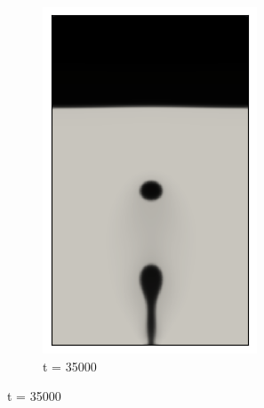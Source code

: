 \begin{figure}[H]
\begin{subfigure}{0.25\textwidth}
		\includegraphics[width=\linewidth]{figs/cap4/cuda_bb_760_d35}
		\caption{t = 35000}
		\label{fig:6}
	\end{subfigure}
	

\end{figure}
